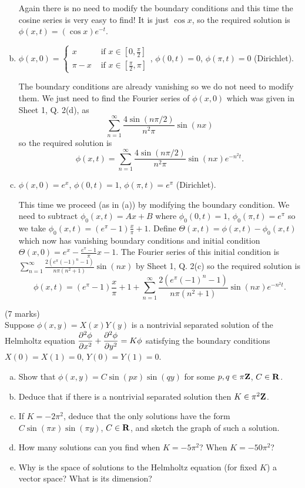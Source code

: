 \documentclass[12pt]{article}
\begin{document}
\begin{answer}
\begin{enumerate}[(a)]
Again there is no need to modify the boundary conditions and this time the cosine series is very easy to find! It is just $\cos x$, so the required solution is $\phi(x,t)=(\cos x)e^{-t}$.
\item $\phi(x,0)=\begin{cases}x&\mbox{ if }x\in\left[0,\tfrac{\pi}{2}\right]\\ \pi-x&\mbox{ if }x\in\left[\tfrac{\pi}{2},\pi\right]\end{cases}$, $\phi(0,t)=0$, $\phi(\pi,t)=0$ (Dirichlet).

The boundary conditions are already vanishing so we do not need to modify them. We just need to find the Fourier series of $\phi(x,0)$ which was given in Sheet 1, Q. 2(d), as
\[\sum_{n=1}^{\infty}\frac{4\sin(n\pi/2)}{n^2\pi}\sin(nx)\]
so the required solution is
\[\phi(x,t)=\sum_{n=1}^{\infty}\frac{4\sin(n\pi/2)}{n^2\pi}\sin(nx)e^{-n^2t}.\]
\item $\phi(x,0)=e^x$, $\phi(0,t)=1$, $\phi(\pi,t)=e^{\pi}$ (Dirichlet).

This time we proceed (as in (a)) by modifying the boundary condition. We need to subtract $\phi_0(x,t)=Ax+B$ where $\phi_0(0,t)=1$, $\phi_0(\pi,t)=e^{\pi}$ so we take $\phi_0(x,t)=(e^{\pi}-1)\frac{x}{\pi}+1$. Define $\Theta(x,t)=\phi(x,t)-\phi_0(x,t)$ which now has vanishing boundary conditions and initial condition $\Theta(x,0)=e^x-\frac{e^{\pi}-1}{\pi}x-1$. The Fourier series of this initial condition is $\sum_{n=1}^{\infty}\frac{2(e^{\pi}(-1)^n-1)}{n\pi(n^2+1)}\sin(nx)$ by Sheet 1, Q. 2(c) so the required solution is
\[\phi(x,t)=(e^{\pi}-1)\frac{x}{\pi}+1+\sum_{n=1}^{\infty}\frac{2(e^{\pi}(-1)^n-1)}{n\pi(n^2+1)}\sin(nx)e^{-n^2t}.\]
\end{enumerate}
\end{answer}
\fi
\newpage

\begin{question}(7 marks)\\
Suppose $\phi(x,y)=X(x)Y(y)$ is a nontrivial separated solution of the Helmholtz equation $\dfrac{\partial^2 \phi}{\partial x^2}+\dfrac{\partial^2 \phi}{\partial y^2}=K\phi$ satisfying the boundary conditions $X(0)=X(1)=0$, $Y(0)=Y(1)=0$.
\begin{enumerate}[(a)]
\item Show that $\phi(x,y)=C\sin(px)\sin(qy)$ for some $p,q\in\pi\mathbf{Z}$, $C\in\mathbf{R}$.
\item Deduce that if there is a nontrivial separated solution then $K\in\pi^2\mathbf{Z}$.
\item If $K=-2\pi^2$, deduce that the only solutions have the form $C\sin(\pi x)\sin(\pi y)$, $C\in\mathbf{R}$, and sketch the graph of such a solution.
\item How many solutions can you find when $K=-5\pi^2$? When $K=-50\pi^2$?
\item Why is the space of solutions to the Helmholtz equation (for fixed $K$) a vector space? What is its dimension?
\end{enumerate}
\end{question}
\end{document}
